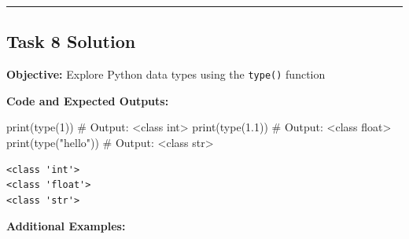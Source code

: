 \documentclass[
  11pt,
]{article}
\newenvironment{Shaded}{\begin{snugshade}}{\end{snugshade}}
\newcommand{\BuiltInTok}[1]{\textcolor[rgb]{0.00,0.23,0.31}{#1}}
\newcommand{\CommentTok}[1]{\textcolor[rgb]{0.37,0.37,0.37}{#1}}
\newcommand{\DecValTok}[1]{\textcolor[rgb]{0.68,0.00,0.00}{#1}}
\newcommand{\FloatTok}[1]{\textcolor[rgb]{0.68,0.00,0.00}{#1}}
\newcommand{\NormalTok}[1]{\textcolor[rgb]{0.00,0.23,0.31}{#1}}
\newcommand{\StringTok}[1]{\textcolor[rgb]{0.13,0.47,0.30}{#1}}
\begin{document}
\begin{center}\rule{0.5\linewidth}{0.5pt}\end{center}

\subsection{Task 8 Solution}\label{task-8-solution}

\textbf{Objective:} Explore Python data types using the \texttt{type()}
function

\textbf{Code and Expected Outputs:}

\begin{Shaded}
\begin{Highlighting}[]
\BuiltInTok{print}\NormalTok{(}\BuiltInTok{type}\NormalTok{(}\DecValTok{1}\NormalTok{))           }\CommentTok{\# Output: \textless{}class \textquotesingle{}int\textquotesingle{}\textgreater{}}
\BuiltInTok{print}\NormalTok{(}\BuiltInTok{type}\NormalTok{(}\FloatTok{1.1}\NormalTok{))         }\CommentTok{\# Output: \textless{}class \textquotesingle{}float\textquotesingle{}\textgreater{}}
\BuiltInTok{print}\NormalTok{(}\BuiltInTok{type}\NormalTok{(}\StringTok{"hello"}\NormalTok{))     }\CommentTok{\# Output: \textless{}class \textquotesingle{}str\textquotesingle{}\textgreater{}}
\end{Highlighting}
\end{Shaded}

\begin{verbatim}
<class 'int'>
<class 'float'>
<class 'str'>
\end{verbatim}

\textbf{Additional Examples:}
\end{document}
